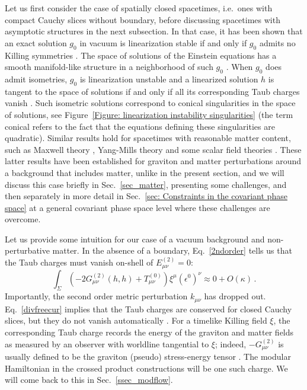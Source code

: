 \documentclass[]{jkpaper}
\theoremstyle{plain}
\theoremstyle{definition}
\begin{document}
Let us first consider the case of spatially closed spacetimes, i.e.\ ones with compact Cauchy slices without boundary, before discussing spacetimes with asymptotic structures in the next subsection. In that case, it has been shown that an exact solution $g_0$ in vacuum is linearization stable if and only if $g_0$ admits no Killing symmetries \cite{Moncrief1,Moncrief:1976un,fischer1980structure,Arms:1982ea,Marsden_lectures}. The space of solutions of the Einstein equations has a smooth manifold-like structure in a neighborhood of such $g_0$ \cite{fischer1980structure,Arms:1982ea,Marsden_lectures}. When $g_0$ does admit isometries, $g_0$ is linearization unstable and a linearized solution $h$ is tangent to the space of solutions if and only if all its corresponding Taub charges vanish \cite{fischer1980structure,Arms:1982ea,Marsden_lectures,Arms:1986vk}. Such isometric solutions correspond to conical singularities in the space of solutions, see Figure~\ref{Figure: linearization instability singularities} (the term conical refers to the fact that the equations defining these singularities are quadratic). Similar results hold for spacetimes with reasonable matter content, such as Maxwell theory \cite{Arms1}, Yang-Mills theory \cite{Arms:1979au,Arms:1982ea,Altas:2021htf} and some scalar field theories \cite{Saraykar:1981qm,Saraykar2}. These latter results have been established for graviton and matter perturbations around a background that includes matter, unlike in the present section, and we will discuss this case briefly in Sec.~\ref{sec_matter}, presenting some challenges, and then separately in more detail in Sec.~\ref{sec: Constraints in the covariant phase space} at a general covariant phase space level where these challenges are overcome.



Let us provide some intuition for our case of a vacuum background and non-perturbative matter. In the absence of a boundary, Eq.~\eqref{2ndorder} tells us that the Taub charges must vanish on-shell of $E^{(2)}_{\mu \nu}=0$:
\begin{equation}\label{2ndorder3}
\int_\Sigma\left(-2G^{(2)}_{\mu \nu}(h,h)+T_{\mu \nu}^{(0)}\right)\xi^\mu(\epsilon^0)^\nu\approx0+O(\kappa)\,.
\end{equation}
Importantly, the second order metric perturbation $k_{\mu \nu}$ has dropped out. Eq.~\eqref{divfreecur} implies that the Taub charges are conserved for closed Cauchy slices, but they do not vanish automatically \cite{Arms:1986vk,Moncrief1,Moncrief:1976un,Moncrief:1978te,Moncrief:1979bg,fischer1980structure,Arms:1982ea,Marsden_lectures,Altas:2018dci,Altas:2019qcv}. For a timelike Killing field $\xi$, the corresponding Taub charge records the energy of the graviton and matter fields as measured by an observer with worldline tangential to $\xi$; indeed, $-G_{\mu \nu}^{(2)}$ is usually defined to be the graviton (pseudo) stress-energy tensor \cite{Wald:1984rg}. The modular Hamiltonian in the crossed product constructions will be one such charge. We will come back to this in Sec.~\ref{ssec_modflow}. 
\end{document}
